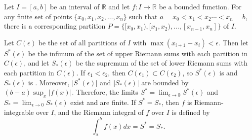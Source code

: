 \documentclass[12pt]{article}
\begin{document}
Let $I=[a,b]$ be an interval of $\mathbb R$ and let $f\colon I\to \mathbb{R}$ be a bounded function. For any finite set of points $\{x_0, x_1, x_2, \dotsc, x_n\}$ such that $a = x_0 < x_1 < x_2 \dotsb < x_n = b$, there is a corresponding partition $P = \{[x_0, x_1), [x_1, x_2), \dotsc, [x_{n-1}, x_n]\}$ of $I$. 

Let $C(\epsilon)$ be the set of all partitions of $I$ with $\max (x_{i+1}-x_i)<\epsilon$.  Then let $S^{*}(\epsilon)$ be the infimum of the set of upper Riemann sums with each partition in $C(\epsilon)$, and let $S_{*}(\epsilon)$ be the supremum of the set of lower Riemann sums with each partition in $C(\epsilon)$. If $\epsilon_1<\epsilon_2$, then $C(\epsilon_1)\subset C(\epsilon_2)$, so $S^{*}(\epsilon)$ is  and $S_{*}(\epsilon)$ is . Moreover, $\lvert S^{*}(\epsilon)\rvert$ and $\lvert S_{*}(\epsilon)\rvert$ are bounded by $(b-a)\sup_x \lvert f(x)\rvert$. Therefore, the limits $S^{*}=\lim_{\epsilon\to 0} S^{*}(\epsilon)$ and $S_{*}=\lim_{\epsilon\to 0} S_{*}(\epsilon)$ exist and are finite.  If $S^{*} = S_{*}$, then $f$ is Riemann-integrable over $I$, and the Riemann integral of $f$ over $I$ is defined by
\begin{equation*}
\int_{a}^{b} f(x)dx = S^{*} = S_{*}.
\end{equation*}
\end{document}
